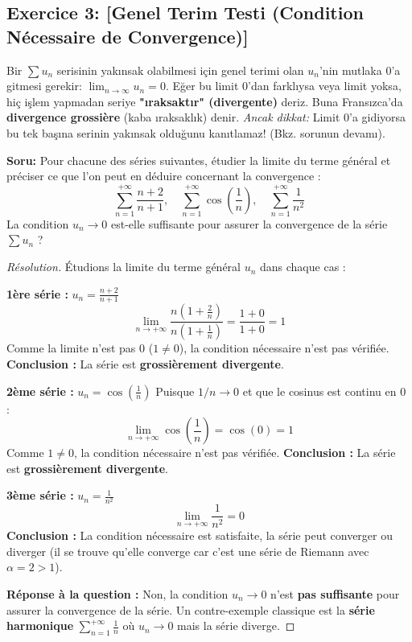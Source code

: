 \documentclass[12pt,a4paper]{report}
\begin{document}
\subsection*{Exercice 3: [Genel Terim Testi (Condition Nécessaire de Convergence)]}

\begin{tcolorbox}[colback=red!5!white,colframe=red!75!black,title=Hatırlatma (Rappel): Yakınsaklık İçin Gerekli Şart]
Bir $\sum u_n$ serisinin yakınsak olabilmesi için genel terimi olan $u_n$'nin mutlaka 0'a gitmesi gerekir: $\lim_{n \to \infty} u_n = 0$. 
Eğer bu limit 0'dan farklıysa veya limit yoksa, hiç işlem yapmadan seriye \textbf{"ıraksaktır" (divergente)} deriz. Buna Fransızca'da \textbf{divergence grossière} (kaba ıraksaklık) denir. 
\textit{Ancak dikkat:} Limit 0'a gidiyorsa bu tek başına serinin yakınsak olduğunu kanıtlamaz! (Bkz. sorunun devamı).
\end{tcolorbox}

\textbf{Soru:}
Pour chacune des séries suivantes, étudier la limite du terme général et préciser ce que l'on peut en déduire concernant la convergence :
\[ \sum_{n=1}^{+\infty} \frac{n+2}{n+1}, \quad \sum_{n=1}^{+\infty} \cos\left(\frac{1}{n}\right), \quad \sum_{n=1}^{+\infty} \frac{1}{n^2} \]
La condition $u_n \to 0$ est-elle suffisante pour assurer la convergence de la série $\sum u_n$ ?

\begin{proof}[Résolution]
Étudions la limite du terme général $u_n$ dans chaque cas :

\textbf{1ère série :} $u_n = \frac{n+2}{n+1}$
\[ \lim_{n \to +\infty} \frac{n(1 + \frac{2}{n})}{n(1 + \frac{1}{n})} = \frac{1+0}{1+0} = 1 \]
Comme la limite n'est pas 0 ($1 \neq 0$), la condition nécessaire n'est pas vérifiée. 
\textbf{Conclusion :} La série est \textbf{grossièrement divergente}.

\textbf{2ème série :} $u_n = \cos\left(\frac{1}{n}\right)$
Puisque $1/n \to 0$ et que le cosinus est continu en 0 :
\[ \lim_{n \to +\infty} \cos\left(\frac{1}{n}\right) = \cos(0) = 1 \]
Comme $1 \neq 0$, la condition nécessaire n'est pas vérifiée.
\textbf{Conclusion :} La série est \textbf{grossièrement divergente}.

\textbf{3ème série :} $u_n = \frac{1}{n^2}$
\[ \lim_{n \to +\infty} \frac{1}{n^2} = 0 \]
\textbf{Conclusion :} La condition nécessaire est satisfaite, la série peut converger ou diverger (il se trouve qu'elle converge car c'est une série de Riemann avec $\alpha=2>1$).

\textbf{Réponse à la question :}
Non, la condition $u_n \to 0$ n'est \textbf{pas suffisante} pour assurer la convergence de la série. Un contre-exemple classique est la \textbf{série harmonique} $\sum_{n=1}^{+\infty} \frac{1}{n}$ où $u_n \to 0$ mais la série diverge.
\end{proof}
\end{document}

